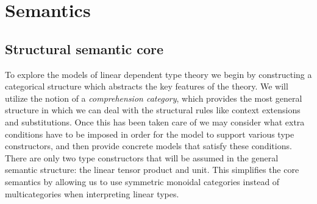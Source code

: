\section{Semantics}
\subsection{Structural semantic core}
To explore the models of linear dependent type theory we begin by constructing a categorical structure which abstracts the key features of the theory. We will utilize the notion of a \textit{comprehension category}, which provides the most general structure in which we can deal with the structural rules like context extensions and substitutions. Once this has been taken care of we may consider what extra conditions have to be imposed in order for the model to support various type constructors, and then provide concrete models that satisfy these conditions.\\

There are only two type constructors that will be assumed in the general semantic structure: the linear tensor product and unit. This simplifies the core semantics by allowing us to use symmetric monoidal categories instead of multicategories when interpreting linear types.

